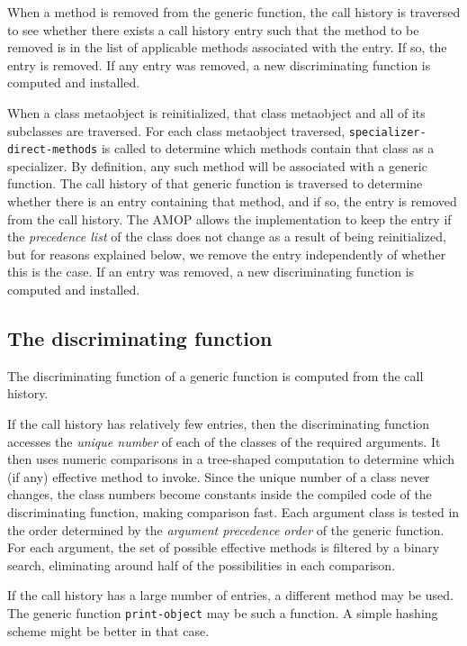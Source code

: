 When a method is removed from the generic function, the call history
is traversed to see whether there exists a call history entry such
that the method to be removed is in the list of applicable methods
associated with the entry.  If so, the entry is removed. If any entry
was removed, a new discriminating function is computed and installed.

When a class metaobject is reinitialized, that class metaobject and
all of its subclasses are traversed.  For each class metaobject
traversed, \texttt{specializer-direct-methods} is called to determine
which methods contain that class as a specializer.  By definition, any
such method will be associated with a generic function.  The call
history of that generic function is traversed to determine whether
there is an entry containing that method, and if so, the entry is
removed from the call history.  The AMOP allows the implementation to
keep the entry if the \emph{precedence list} of the class does not
change as a result of being reinitialized, but for reasons explained
below, we remove the entry independently of whether this is the case.
If an entry was removed, a new discriminating function is computed and
installed.

\subsection{The discriminating function}
\label{sec-generic-function-dispatch-the-discriminating-function}

The discriminating function of a generic function is computed from the
call history.

If the call history has relatively few entries, then the
discriminating function accesses the \emph{unique number} of each of
the classes of the required arguments.  It then uses numeric
comparisons in a tree-shaped computation to determine which (if any)
effective method to invoke.  Since the unique number of a class never
changes, the class numbers become constants inside the compiled code
of the discriminating function, making comparison fast.  Each argument
class is tested in the order determined by the \emph{argument
  precedence order} of the generic function.  For each argument, the
set of possible effective methods is filtered by a binary search,
eliminating around half of the possibilities in each comparison.

If the call history has a large number of entries, a different method
may be used.  The generic function \texttt{print-object} may be such a
function.  A simple hashing scheme might be better in that case.  

